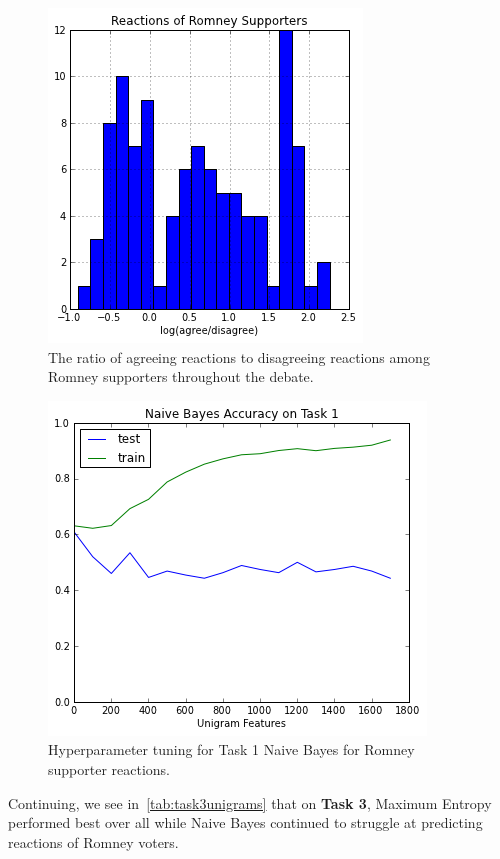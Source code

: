 \begin{figure}[]
	\centering
	\includegraphics[scale=0.60]{Figures/ngrams_balance_rom.png}
	\caption{The ratio of agreeing reactions to disagreeing reactions among Romney supporters throughout the debate.}
	\label{fig:ngramsbalancerom}
\end{figure}

\begin{figure}[]
	\centering
	\includegraphics[scale=0.60]{Figures/ngrams_hyperparam_task2_rom.png}
	\caption{Hyperparameter tuning for Task 1 Naive Bayes for Romney supporter reactions.}
	\label{fig:ngramstask2hyperparamrom}
\end{figure}

Continuing, we see in~\ref{tab:task3unigrams} that on \textbf{Task 3}, Maximum Entropy performed best over all while Naive Bayes continued to struggle at predicting reactions of Romney voters.

